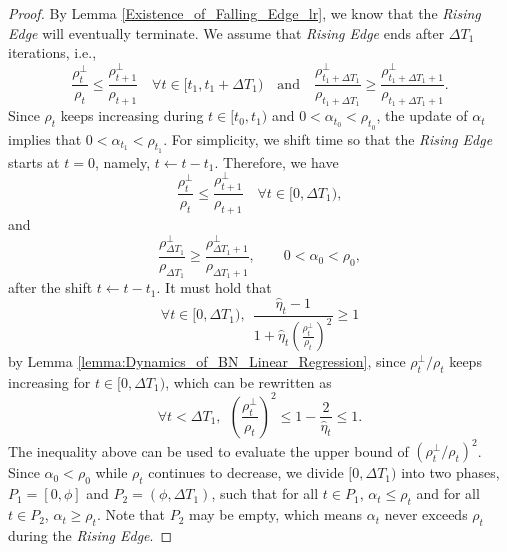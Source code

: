 \documentclass[10pt,a4paper]{amsart}
\begin{document}
\begin{proof}
  By Lemma \ref{Existence_of_Falling_Edge_lr}, we know that the \textit{Rising Edge} will eventually terminate. 
  We assume that \textit{Rising Edge} ends after \( \Delta T_1 \) iterations, i.e., 
  \[
    \frac{\rho_t^{\perp}}{\rho_t} \le \frac{\rho_{t+1}^{\perp}}{\rho_{t+1}} 
    \quad \forall t \in [t_1, t_1 + \Delta T_1)
    \quad \text{and} \quad 
    \frac{\rho_{t_1 + \Delta T_1}^{\perp}}{\rho_{t_1 + \Delta T_1}} \ge \frac{\rho_{t_1 + \Delta T_1+1}^{\perp}}{\rho_{t_1 + \Delta T_1+1}} .
  \]
  Since $\rho_t$ keeps increasing during $t \in [t_0, t_1)$ and $0 < \alpha_{t_0} < \rho_{t_0}$, 
  the update of $\alpha_t$ implies that $0 < \alpha_{t_1} < \rho_{t_1}$. 
  For simplicity, we shift time so that the \textit{Rising Edge} starts at $t=0$, namely,
  $t \leftarrow t - t_1$. 
  Therefore, we have 
  \[
    \frac{\rho_t^{\perp}}{\rho_t} \le \frac{\rho_{t+1}^{\perp}}{\rho_{t+1}} 
    \quad \forall t \in [0, \Delta T_1),
  \]
  and
  \[
    \frac{\rho_{\Delta T_1 }^{\perp}}{\rho_{\Delta T_1 }} \ge \frac{\rho_{\Delta T_1 +1}^{\perp}}{\rho_{\Delta T_1 +1}},
    \qquad
    0 < \alpha_0 < \rho_0,
  \]
  after the shift $t \leftarrow t - t_1$.
  It must hold that
  \[
  \forall t \in [0, \Delta T_1), \ \  \frac{\hat{\eta}_t - 1}{1 + \hat{\eta}_t \left( \frac{\rho_t^{\perp}}{\rho_t} \right)^2} \ge 1
  \]
  by Lemma \ref{lemma:Dynamics_of_BN_Linear_Regression}, 
  since \( {\rho_t^{\perp}}/{\rho_t} \) keeps increasing for \( t \in [0, \Delta T_1) \), 
  which can be rewritten as
  \begin{equation}
    \forall t < \Delta T_1, \ \  \left( \frac{\rho_t^{\perp}}{\rho_t} \right)^2 \le 1 - \frac{2}{\hat{\eta}_t} \le 1. 
    \label{eq:first}
  \end{equation}
  The inequality above can be used to evaluate the upper bound of \( \left( {\rho_t^{\perp}}/{\rho_t} \right)^2 \). 
  Since \( \alpha_0 < \rho_0 \) while \( \rho_t \) continues to decrease, we divide \( [0, \Delta T_1) \) 
  into two phases, \( P_1 = [0, \phi] \) and \( P_2 = (\phi, \Delta T_1) \), 
  such that for all \( t \in P_1 \), \( \alpha_t \le \rho_t \) and for all \( t \in P_2 \), \( \alpha_t \ge \rho_t \). 
  Note that \( P_2 \) may be empty, which means \( \alpha_t \) never exceeds \( \rho_t \) during the \textit{Rising Edge}.
  

\end{proof}
\end{document}
